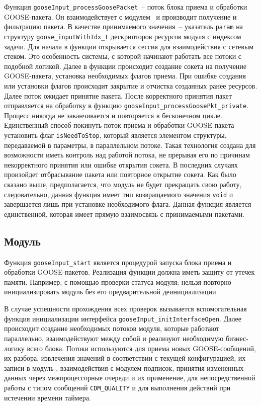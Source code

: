 Функция \lstinline{gooseInput_processGoosePacket}~-- поток блока приема и обработки GOOSE-пакета. Он взаимодействует с модулем \moduleOsal\ и производит получение и фильтрацию пакета. В качестве принимаемого значения~-- указатель \lstinline{param} на структуру
\lstinline{goose_inputWithIdx_t} дескрипторов ресурсов модуля с индексом задачи. Для начала в функции открывается сессия для взаимодействия с сетевым стеком. Это особенность системы, с которой начинают работать все потоки с подобной логикой. Далее в функции происходит создание сокета на получение GOOSE-пакета, установка необходимых флагов приема. При ошибке создания или установки флагов происходит закрытие и отчистка созданных ранее ресурсов. Далее поток ожидает принятие пакета. После корректного принятия пакет отправляется на обработку в функцию \lstinline{gooseInput_processGoosePkt_private}. Процесс никогда не заканчивается и повторяется в бесконечном цикле. Единственный способ покинуть поток приема и обработки GOOSE-пакета~-- установить флаг \lstinline{isNeedToStop}, который является элементом структуры, передаваемой в параметры, в параллельном потоке. Такая технология создана для возможности иметь контроль над работой потока, не прерывая его по причинам некорректного принятия или ошибке открытия сокета. В последних случаях произойдет отбрасывание пакета или повторное открытие сокета. Как было сказано выше, предполагается, что модуль не будет прекращать свою работу, следовательно, данная функция имеет тип возвращаемого значения \lstinline{void} и завершается лишь при установке необходимого флага. Данная функция является единственной, которая имеет прямую взаимосвязь с принимаемыми пакетами.

\subsection{Модуль \moduleThreads}

Функция \lstinline{gooseInput_start} является процедурой запуска блока приема и
обработки GOOSE-пакетов. Реализация функции должна иметь защиту от
утечек памяти. Например, с помощью проверки статуса модуля:
нельзя повторно инициализировать модуль без его предварительной деинициализации.

В случае успешности прохождения всех проверок вызывается вспомогательная
функция инициализации
интерфейса \lstinline{gooseInput_initInterfaceOpen}. Далее происходит создание
необходимых потоков модуля, которые работают параллельно, взаимодействуют между собой и реализуют необходимую бизнес-логику всего блока.
Потоки используются
для приема новых GOOSE-сообщений, их разбора, извлечения значений в соответствии с текущей конфигурацией, их записи в модуль \moduleDataStoring,
взаимодействия с модулем подписок, принятия измененных данных через межпроцессорные очереди и их применение, для непосредственной
работы с типом сообщений \lstinline{CDM_QUALITY} и для выполнения действий при истечении времени таймера.

